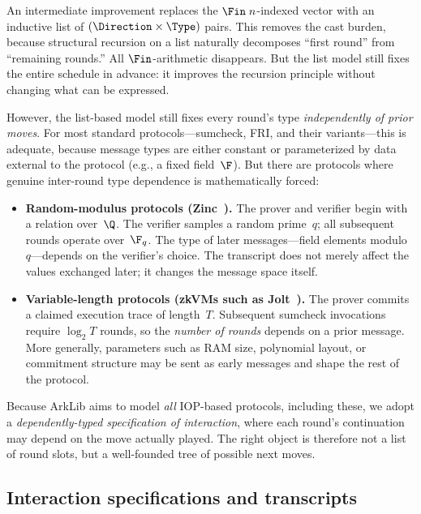 An intermediate improvement replaces the $\Fin\;n$-indexed vector with an
inductive list of $(\Direction \times \Type)$ pairs.  This removes the
cast burden, because structural recursion on a list naturally decomposes
``first round'' from ``remaining rounds.''  All $\Fin$-arithmetic disappears.
But the list model still fixes the entire schedule in advance: it improves the
recursion principle without changing what can be expressed.

However, the list-based model still fixes every round's type \emph{independently
of prior moves}.  For most standard protocols---sumcheck, FRI, and their
variants---this is adequate, because message types are either constant or
parameterized by data external to the protocol (e.g., a fixed field~$\F$).
But there are protocols where genuine inter-round type dependence is
mathematically forced:

\begin{itemize}
  \item \textbf{Random-modulus protocols (Zinc~\cite{Zinc}).}
    The prover and verifier begin with a relation over~$\Q$.
    The verifier samples a random prime~$q$; all subsequent rounds
    operate over~$\F_q$.  The type of later messages---field elements
    modulo~$q$---depends on the verifier's choice.  The transcript does not
    merely affect the values exchanged later; it changes the message space
    itself.

  \item \textbf{Variable-length protocols (zkVMs such as Jolt~\cite{Jolt}).}
    The prover commits a claimed execution trace of length~$T$.
    Subsequent sumcheck invocations require $\log_2 T$ rounds, so the
    \emph{number of rounds} depends on a prior message.  More generally,
    parameters such as RAM size, polynomial layout, or commitment structure
    may be sent as early messages and shape the rest of the protocol.
\end{itemize}

Because ArkLib aims to model \emph{all} IOP-based protocols, including these,
we adopt a \emph{dependently-typed specification of interaction}, where each
round's continuation may depend on the move actually played.  The right object
is therefore not a list of round slots, but a well-founded tree of possible next
moves.

\subsection{Interaction specifications and transcripts}

